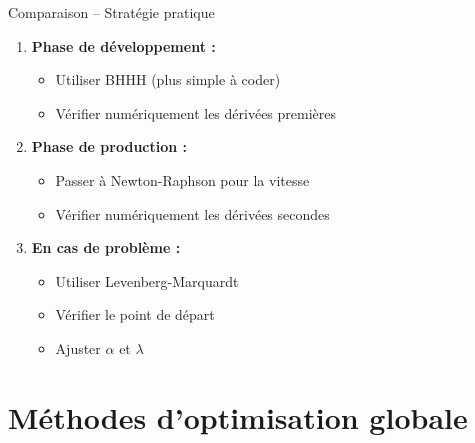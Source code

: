 \documentclass[11pt,aspectratio=169]{beamer}
\begin{document}
\begin{frame}{Comparaison -- Stratégie pratique}

\begin{enumerate}

\item \textbf{Phase de développement :}
  \begin{itemize}
    \item Utiliser BHHH (plus simple à coder)
    \item Vérifier numériquement les dérivées premières
  \end{itemize}

  \vspace{0.3cm}

\item \textbf{Phase de production :}
  \begin{itemize}
    \item Passer à Newton-Raphson pour la vitesse
    \item Vérifier numériquement les dérivées secondes
  \end{itemize}

  \vspace{0.3cm}

\item \textbf{En cas de problème :}
  \begin{itemize}
    \item Utiliser Levenberg-Marquardt
    \item Vérifier le point de départ
    \item Ajuster $\alpha$ et $\lambda$
  \end{itemize}

\end{enumerate}

\end{frame}

\section{Méthodes d'optimisation globale}
\end{document}
